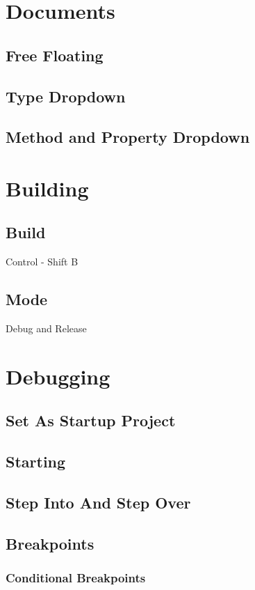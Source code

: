 \documentclass {amsart}
\begin{document}
\section{Documents}
	\subsection{Free Floating}
	\subsection{Type Dropdown}
	\subsection{Method and Property Dropdown}

	

\section{Building}
	\subsection{Build}  Control - Shift B
	\subsection{Mode} Debug and Release


\section{Debugging}
	\subsection{Set As Startup Project}
	\subsection{Starting}
	\subsection{Step Into And Step Over}
	\subsection{Breakpoints}
		\subsubsection{Conditional Breakpoints}
\end{document}
